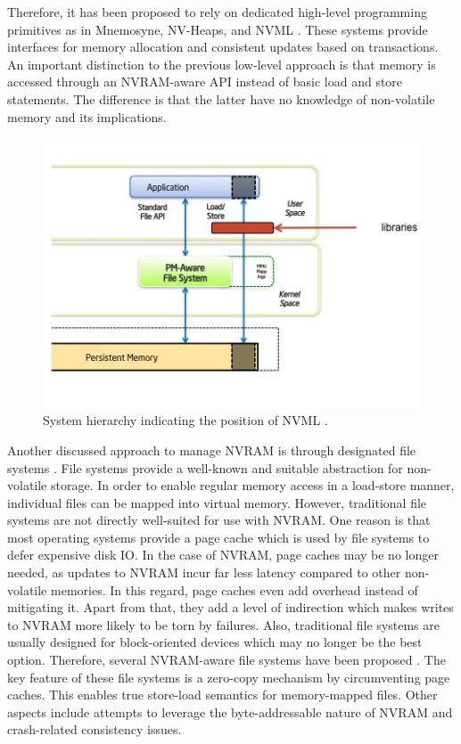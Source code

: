 Therefore, it has been proposed to rely on dedicated high-level programming
primitives as in Mnemosyne, NV-Heaps, and NVML \cite{volos2011mnemosyne,
coburn2011nv_heaps, intel2017nvml}. These systems provide interfaces for memory
allocation and consistent updates based on transactions. An important
distinction to the previous low-level approach is that memory is accessed
through an \ac{NVRAM}-aware \ac{API} instead of basic load and store statements.
The difference is that the latter have no knowledge of non-volatile memory and
its implications.

\begin{figure}[h!]
    \centering
    \includegraphics[scale=0.75]{figures/nvml-arch.jpg}
    \caption{System hierarchy indicating the position of NVML \cite{intel2014nvml}.}
    \label{fig:nvml}
\end{figure}

Another discussed approach to manage \ac{NVRAM} is through designated file
systems \cite{oukid2017data, andrei2017sap}. File systems provide a well-known
and suitable abstraction for non-volatile storage. In order to enable regular
memory access in a load-store manner, individual files can be mapped into
virtual memory. However, traditional file systems are not directly well-suited
for use with \ac{NVRAM}. One reason is that most operating systems provide a
page cache which is used by file systems to defer expensive disk \ac{IO}. In the
case of \ac{NVRAM}, page caches may be no longer needed, as updates to
\ac{NVRAM} incur far less latency compared to other non-volatile memories. In
this regard, page caches even add overhead instead of mitigating it. Apart from
that, they add a level of indirection which makes writes to \ac{NVRAM} more
likely to be torn by failures. Also, traditional file systems are usually
designed for block-oriented devices which may no longer be the best option.
Therefore, several \ac{NVRAM}-aware file systems have been proposed
\cite{condit2009better, wu2011scmfs, dulloor2014system, xu2016nova}. The key
feature of these file systems is a zero-copy mechanism by circumventing page
caches. This enables true store-load semantics for memory-mapped files. Other
aspects include attempts to leverage the byte-addressable nature of \ac{NVRAM}
and crash-related consistency issues.

